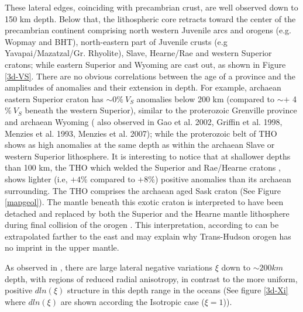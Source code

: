 \documentclass[12pt]{article}
\begin{document}
		These lateral edges, coinciding with precambrian crust, are well observed down to 150 km depth. 
		Below that, the lithospheric core retracts toward the center of the precambrian continent comprising north western Juvenile arcs and orogens (e.g. Wopmay and BHT), north-eastern part of Juvenile crusts (e.g Yavapai/Mazatzal/Gr. Rhyolite), Slave, Hearne/Rae and western Superior cratons; while eastern Superior and Wyoming are cast out, as shown in Figure \ref{3d-VS}. 
		There are no obvious correlations between the age of a province and the amplitudes of anomalies and their extension in depth. 
		For example, archaean eastern Superior craton has $\sim 0\% \: V_S$ anomalies below 200 km (compared to $\sim+$ 4 $\%\:V_S$ beneath the western Superior), similar to the proterozoic Grenville province and archaean Wyoming ( also observed in Gao et al. 2002, Griffin et al. 1998, Menzies et al. 1993, Menzies et al. 2007); while the proterozoic belt of THO shows as high anomalies at the same depth as within the archaean Slave or western Superior lithosphere. 
		It is interesting to notice that at shallower depths than 100 km, the THO which welded the Superior and Rae/Hearne cratons \citep{hoffman1988united}, shows lighter (i.e, $+4\%$ compared to $+8\%$) positive anomalies than its archaean surrounding. 
		The THO comprises the archaean aged Sask craton (See Figure \ref{mapgeol}).
		The mantle beneath this exotic craton is interpreted to have been detached and replaced by both the Superior and the Hearne mantle lithosphere during final collision of the orogen \citep{nemeth2005lithospheric}. 
		This interpretation, according to \cite{faure2011seismic} can be extrapolated farther to the east and may explain why Trans-Hudson orogen has no imprint in the upper mantle. 

		As observed in \cite{babuvska1998age,gung2003global,yuan2014lithospheric}, there are large lateral negative variations $\xi$ down to $\sim 200km$ depth, with regions of reduced radial anisotropy, in contrast to the more uniform, positive $dln(\xi)$ structure in this depth range in the oceans (See figure \ref{3d-Xi} where $dln(\xi)$ are shown according the Isotropic case ($\xi = 1$)). 
		
\end{document}
